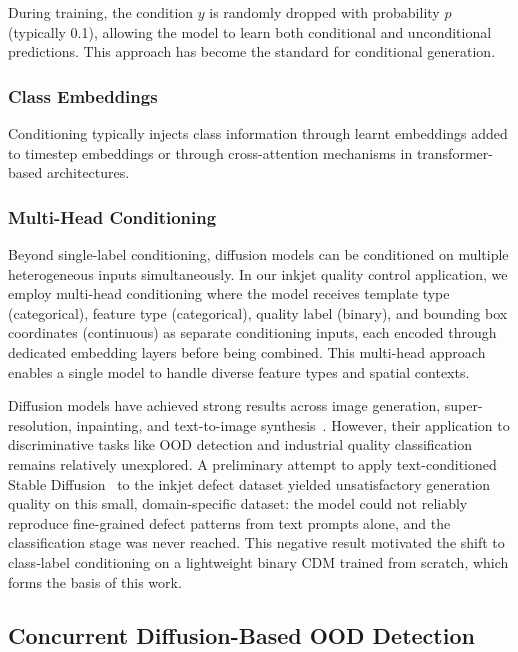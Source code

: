 During training, the condition $y$ is randomly dropped with probability $p$ (typically 0.1), allowing the model to learn both conditional and unconditional predictions. This approach has become the standard for conditional generation.

\subsubsection{Class Embeddings}
\label{sec:bg:diffusion:class-embeddings}

Conditioning typically injects class information through learnt embeddings added to timestep embeddings or through cross-attention mechanisms in transformer-based architectures.

\subsubsection{Multi-Head Conditioning}
\label{sec:bg:diffusion:multi-head}

Beyond single-label conditioning, diffusion models can be conditioned on multiple heterogeneous inputs simultaneously. In our inkjet quality control application, we employ multi-head conditioning where the model receives template type (categorical), feature type (categorical), quality label (binary), and bounding box coordinates (continuous) as separate conditioning inputs, each encoded through dedicated embedding layers before being combined. This multi-head approach enables a single model to handle diverse feature types and spatial contexts.

Diffusion models have achieved strong results across image generation, super-resolution, inpainting, and text-to-image synthesis~\cite{dhariwal2021diffusion, rombach2022highresolution}. However, their application to discriminative tasks like OOD detection and industrial quality classification remains relatively unexplored. A preliminary attempt to apply text-conditioned Stable Diffusion~\cite{rombach2022highresolution} to the inkjet defect dataset yielded unsatisfactory generation quality on this small, domain-specific dataset: the model could not reliably reproduce fine-grained defect patterns from text prompts alone, and the classification stage was never reached. This negative result motivated the shift to class-label conditioning on a lightweight binary CDM trained from scratch, which forms the basis of this work.

\subsection{Concurrent Diffusion-Based OOD Detection}
\label{sec:bg:diffusion:concurrent}

